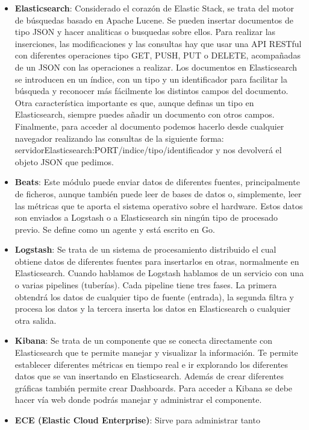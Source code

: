 \begin{itemize}
\item \textbf{Elasticsearch}: Considerado el corazón de Elastic Stack, se
  trata del motor de búsquedas basado en Apache Lucene. Se pueden insertar
  documentos de tipo JSON y hacer analiticas o busquedas sobre ellos. Para
  realizar las inserciones, las modificaciones y las consultas hay que usar
  una API RESTful con diferentes operaciones tipo GET, PUSH, PUT o DELETE,
  acompañadas de un JSON con las operaciones a realizar. Los documentos en
  Elasticsearch se introducen en un índice, con un tipo y un identificador
  para facilitar la búsqueda y reconocer más fácilmente los distintos
  campos del documento. Otra característica importante es que, aunque
  definas un tipo en Elasticsearch, siempre puedes añadir un documento con
  otros campos. Finalmente, para acceder al documento podemos hacerlo desde
  cualquier navegador realizando las consultas de la siguiente forma:
  servidorElasticsearch:PORT/indice/tipo/identificador y nos devolverá el
  objeto JSON que pedimos.
\item \textbf{Beats}: Este módulo puede enviar datos de diferentes fuentes,
  principalmente de ficheros, aunque también puede leer de bases de datos
  o, simplemente, leer las métricas que te aporta el sistema operativo
  sobre el hardware. Estos datos son enviados a Logstash o a Elasticsearch
  sin ningún tipo de procesado previo. Se define como un agente y está
  escrito en Go.
\item \textbf{Logstash}: Se trata de un sistema de procesamiento
  distribuido el cual obtiene datos de diferentes fuentes para insertarlos
  en otras, normalmente en Elasticsearch. Cuando hablamos de Logstash
  hablamos de un servicio con una o varias pipelines (tuberías). Cada
  pipeline tiene tres fases. La primera obtendrá los datos de cualquier
  tipo de fuente (entrada), la segunda filtra y procesa los datos y la
  tercera inserta los datos en Elasticsearch o cualquier otra salida.
\item \textbf{Kibana}: Se trata de un componente que se conecta
  directamente con Elasticsearch que te permite manejar y visualizar la
  información. Te permite establecer diferentes métricas en tiempo real e
  ir explorando los diferentes datos que se van insertando en
  Elasticsearch. Además de crear diferentes gráficas también permite crear
  Dashboards. Para acceder a Kibana se debe hacer vía web donde podrás
  manejar y administrar el componente.
\item \textbf{ECE (Elastic Cloud Enterprise)}: Sirve para administrar tanto

\end{itemize}

